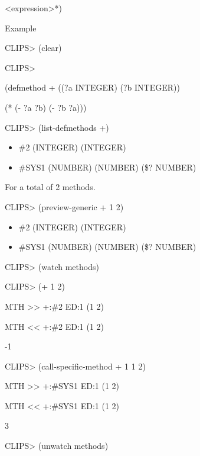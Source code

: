 \documentclass[letterpaper,10pt,english]{sphinxmanual}
\begin{document}

\begin{sphinxVerbatim}[commandchars=\\\{\}]
  
\end{sphinxVerbatim}

\textless{}expression\textgreater{}*)

Example

CLIPS\textgreater{} (clear)

CLIPS\textgreater{}

(defmethod + ((?a INTEGER) (?b INTEGER))

(* (- ?a ?b) (- ?b ?a)))

CLIPS\textgreater{} (list-defmethods +)
\begin{itemize}
\item {} 
\#2 (INTEGER) (INTEGER)

\item {} 
\#SYS1 (NUMBER) (NUMBER) (\$? NUMBER)

\end{itemize}

For a total of 2 methods.

CLIPS\textgreater{} (preview-generic + 1 2)
\begin{itemize}
\item {} 
\#2 (INTEGER) (INTEGER)

\item {} 
\#SYS1 (NUMBER) (NUMBER) (\$? NUMBER)

\end{itemize}

CLIPS\textgreater{} (watch methods)

CLIPS\textgreater{} (+ 1 2)

MTH \textgreater{}\textgreater{} +:\#2 ED:1 (1 2)

MTH \textless{}\textless{} +:\#2 ED:1 (1 2)

-1

CLIPS\textgreater{} (call-specific-method + 1 1 2)

MTH \textgreater{}\textgreater{} +:\#SYS1 ED:1 (1 2)

MTH \textless{}\textless{} +:\#SYS1 ED:1 (1 2)

3

CLIPS\textgreater{} (unwatch methods)
\end{document}
